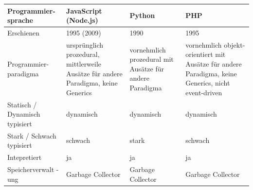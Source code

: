 \begin{table}[H]
    \centering
    \begin{tabular}{|p{3cm}|p{3.7cm}|p{3.7cm}|p{3.7cm}|}
    \hline
    \textbf{Programmier-sprache}                                                                        & \textbf{JavaScript (Node.js)}                                                              & \textbf{Python}                                                  & \textbf{PHP}                                                                                                \\ \hline\hline
    Erschienen                                                                                   & 1995 (2009)                                                                        & 1990                                                    & 1995                                                                                               \\ \hline
    Programmier- paradigma \cite{wiki_pl} & ursprünglich prozedural, mittlerweile Ausätze für andere Paradigma, keine Generics & vornehmlich prozedural mit Ausätze für andere Paradigma & vornehmlich objekt-orientiert mit Ausätze für andere Paradigma, keine Generics, nicht event-driven \\ \hline
    Statisch / Dynamisch typisiert \cite{wiki_type}                                                              & dynamisch                                                                          & dynamisch                                               & dynamisch                                                                                          \\ \hline
    Stark / Schwach typisiert \cite{wiki_type}                                                                   & schwach                                                                            & stark                                                   & schwach                                                                                            \\ \hline
    Intepretiert                                                                                 & ja                                                                                 & ja                                                      & ja                                                                                                 \\ \hline
    Speicherverwalt -ung                                                                        & Garbage Collector                                                                  & Garbage Collector                                       & Garbage Collector                                                                                  \\ \hline

\end{tabular}
\end{table}
